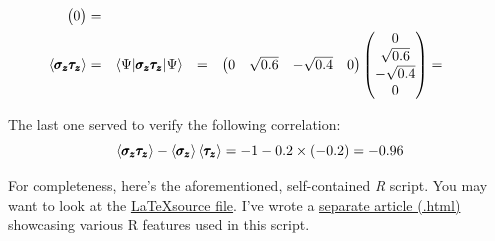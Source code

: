\documentclass[solutions.tex]{subfiles}
\begin{document}
\begin{equation*}
\begin{aligned}
\begin{pmatrix}
			0 \\
		\end{pmatrix} &=&&  \\
	\left\langle \pmb{\sigma_z\tau_z} \right\rangle &=&& \langle \Psi|\pmb{\sigma_z\tau_z}|\Psi\rangle
		&=&& \begin{pmatrix} 0 & \sqrt{0.6} & -\sqrt{0.4} & 0\end{pmatrix}
		\begin{pmatrix}
			0 \\
			\sqrt{0.6} \\
			-\sqrt{0.4} \\
			0 \\
		\end{pmatrix} &=&&  \\
\end{aligned}\end{equation*}

The last one served to verify the following correlation:
\[
	\left\langle \pmb{\sigma_z\tau_z} \right\rangle - \left\langle \pmb{\sigma_z} \right\rangle\left\langle \pmb{\tau_z} \right\rangle
		= -1 -0.2\times(-0.2) = -0.96
\]

\hr
For completeness, here's the aforementioned, self-contained \textit{R}
script. You may want to look at the
\href{https://github.com/mbivert/ttm/blob/master/qm/L07E12.tex}{\LaTeX source file}.
I've wrote a \href{https://tales.mbivert.com/on-r-language/}{separate article (.html)}
showcasing various R features used in this script.


\end{document}
